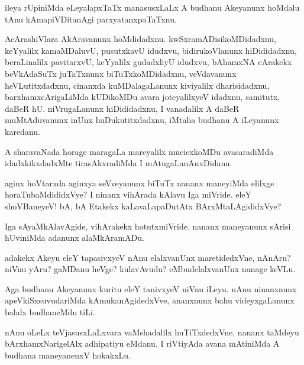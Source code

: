 \documentclass{article}
\begin{document}
\begin{mn}
ileya rUpiniMda eLeyalapxTaTx manasusxLaLx A budhanu Akeyanunx hoMdalu
tAnu kAmapiVDitanAgi parxyatanxpaTaTxnu.
\end{mn}

\begin{mn}%
AcArashiVlara AkAravanunx hoMdidadxnu. kwSxramADisikoMDidadxnu,
keYyalilx kamaMDaluvU, pusutxkavU idudxvu, bidirukoVlanunx
hiDididadxnu, beraLinalilx pavitarxvU, keYyalilx gudadxliyU idudxvu,
bAhamxNA cArakekx beVkAdaSuTx juTaTxnunx biTuTxkoMDidadxnu,
veVdavanunx heVLutitxdadxnu, cinanxda kuMDalagaLanunx kiviyalilx
dharisidadxnu, barxhamxcArigaLiMda kUDikoMDu avara joteyalilxyeV
idadxnu, samitutx, daBeR hU. niVrugaLanunx hiDididadxnu, I vanadalilx
A daBeR muMtAduvanunx inUnx huDukutitxdadxnu, iMtaha budhanu A
iLeyanunx karedanu.
\end{mn}

\begin{mn}
A sharavaNada horage maragaLa mareyalilx mucicxkoMDu avasaradiMda
idadxkikxdadxMte tirasAkxradiMda I mAtugaLanAnxDidanu.
\end{mn}

\begin{mn}
aginx hoVtarxda aginxya seVveyanunx biTuTx nananx maneyiMda elilxge
horaTubaMdididxVye? I ninanx vihArada kAlavu Iga miVride. eleY
shoVBaneyeV! bA, bA Etakekx kaLavaLapaDutAtx BArxMtaLAgididxVye?
\end{mn}

\begin{mn}%
Iga sAyaMkAlavAgide, vihArakekx hotutxmiVride. nananx maneyanunx
sArisi hUviniMda adanunx alaMkAramADu.
\end{mn}

\begin{mn}%
adakekx Akeyu eleY tapasivxyeV nAnu elalxvanUnx maretidedxVne, nAnAru?
niVnu yAru? gaMDanu heVge? kulavAvudu? eMbudelalxvanUnx nanage keVLu.
\end{mn}

\begin{mn}
Aga budhanu Akeyanunx kuritu eleY tanivxyeV niVnu iLeyu. nAnu
ninanxnunx apeVkiSxsuvudariMda kAmukanAgidedxVve, ananxnunx bahu
videyxgaLanunx balalx budhaneMdu tiLi.
\end{mn}

\begin{mn}
nAnu oLeLx teVjasusxLaLxvara vaMshadalilx huTiTxdedxVne, nananx
taMdeyu bArxhamxNarigelAlx adhipatiyu eMdanu. I riVtiyAda avana
mAtiniMda A budhana maneyanenxV hokakxLu.
\end{mn}
\end{document}
